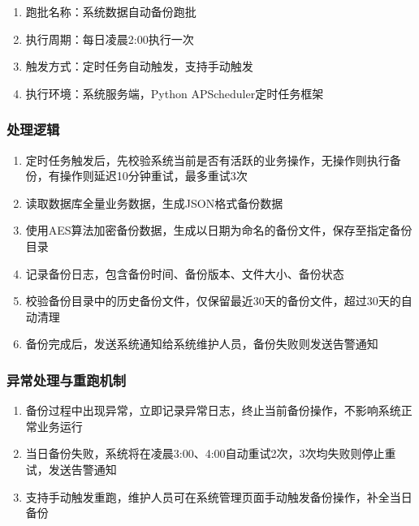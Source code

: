 \documentclass[12pt, a4paper]{article}
\begin{document}
\begin{enumerate}
\item  跑批名称：系统数据自动备份跑批

\item  执行周期：每日凌晨2:00执行一次

\item  触发方式：定时任务自动触发，支持手动触发

\item  执行环境：系统服务端，Python APScheduler定时任务框架
\end{enumerate}

\subsubsection{处理逻辑}

\begin{enumerate}
\item  定时任务触发后，先校验系统当前是否有活跃的业务操作，无操作则执行备份，有操作则延迟10分钟重试，最多重试3次

\item  读取数据库全量业务数据，生成JSON格式备份数据

\item  使用AES算法加密备份数据，生成以日期为命名的备份文件，保存至指定备份目录

\item  记录备份日志，包含备份时间、备份版本、文件大小、备份状态

\item  校验备份目录中的历史备份文件，仅保留最近30天的备份文件，超过30天的自动清理

\item  备份完成后，发送系统通知给系统维护人员，备份失败则发送告警通知
\end{enumerate}

\subsubsection{异常处理与重跑机制}

\begin{enumerate}
\item  备份过程中出现异常，立即记录异常日志，终止当前备份操作，不影响系统正常业务运行

\item  当日备份失败，系统将在凌晨3:00、4:00自动重试2次，3次均失败则停止重试，发送告警通知

\item  支持手动触发重跑，维护人员可在系统管理页面手动触发备份操作，补全当日备份
\end{enumerate}
\end{document}
